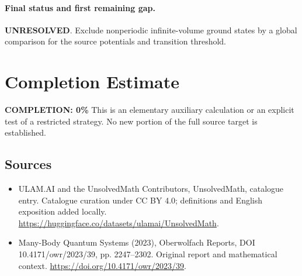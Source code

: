 \documentclass[11pt]{article}
\begin{document}
\paragraph{Final status and first remaining gap.}
\textbf{UNRESOLVED}. Exclude nonperiodic infinite-volume ground states by a global comparison for the source potentials and transition threshold.

\section{Completion Estimate}
\noindent\textbf{COMPLETION: 0\%}
This is an elementary auxiliary calculation or an explicit test of a restricted strategy. No new portion of the full source target is established.

\subsection{Sources}
\begin{itemize}
\item[\hypertarget{source:statement:1}{S1}] ULAM.AI and the UnsolvedMath Contributors, UnsolvedMath, catalogue entry. Catalogue curation under CC BY 4.0; definitions and English exposition added locally.
\url{https://huggingface.co/datasets/ulamai/UnsolvedMath}.
\item[\hypertarget{source:statement:2}{S2}] Many-Body Quantum Systems (2023), Oberwolfach Reports, DOI 10.4171/owr/2023/39, pp. 2247--2302. Original report and mathematical context.
\url{https://doi.org/10.4171/owr/2023/39}.
\end{itemize}
\label{end:statement}
\end{document}
